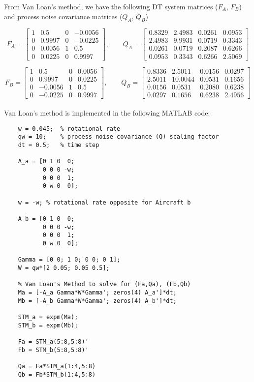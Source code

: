\documentclass[]{article}
\begin{document}
\noindent From Van Loan's method, we have the following DT system matrices ($F_A$, $F_B$) and process noise covariance matrices ($Q_A$, $Q_B$)

$$
F_A = \left[\begin{array}{cccc}
1 & 0.5    & 0 & -0.0056\\
0 & 0.9997 & 0 & -0.0225\\
0 & 0.0056 & 1 &  0.5\\
0 & 0.0225 & 0 &  0.9997
\end{array}\right],\qquad
Q_A = \left[\begin{array}{cccc}
0.8329 &   2.4983 &   0.0261 &   0.0953\\
2.4983 &   9.9931 &   0.0719 &   0.3343\\
0.0261 &   0.0719 &   0.2087 &   0.6266\\
0.0953 &   0.3343 &   0.6266 &   2.5069
\end{array}\right]
$$

$$
F_B = \left[\begin{array}{cccc}
1 & 0.5     & 0 & 0.0056\\
0 & 0.9997  & 0 & 0.0225\\
0 & -0.0056 & 1 & 0.5\\
0 & -0.0225 & 0 & 0.9997
\end{array}\right],\qquad
Q_B = \left[\begin{array}{cccc}
0.8336 &   2.5011  &  0.0156 &   0.0297\\
2.5011 &   10.0044 &  0.0531 &   0.1656\\
0.0156 &   0.0531  &  0.2080 &   0.6238\\
0.0297 &   0.1656  &  0.6238 &   2.4956
\end{array}\right]
$$\\

\noindent Van Loan's method is implemented in the following MATLAB code:

\begin{lstlisting}
	w = 0.045;  % rotational rate
	qw = 10;    % process noise covariance (Q) scaling factor
	dt = 0.5;   % time step
	
	A_a = [0 1 0  0;
	       0 0 0 -w;
	       0 0 0  1;
	       0 w 0  0];
	
	w = -w; % rotational rate opposite for Aircraft b
	
	A_b = [0 1 0  0;
	       0 0 0 -w;
	       0 0 0  1;
	       0 w 0  0];
	
	Gamma = [0 0; 1 0; 0 0; 0 1];
	W = qw*[2 0.05; 0.05 0.5];
	
	% Van Loan's Method to solve for (Fa,Qa), (Fb,Qb)
	Ma = [-A_a Gamma*W*Gamma'; zeros(4) A_a']*dt;
	Mb = [-A_b Gamma*W*Gamma'; zeros(4) A_b']*dt;
	
	STM_a = expm(Ma);
	STM_b = expm(Mb);
	
	Fa = STM_a(5:8,5:8)'
	Fb = STM_b(5:8,5:8)'
	
	Qa = Fa*STM_a(1:4,5:8)
	Qb = Fb*STM_b(1:4,5:8)
\end{lstlisting}
\end{document}
